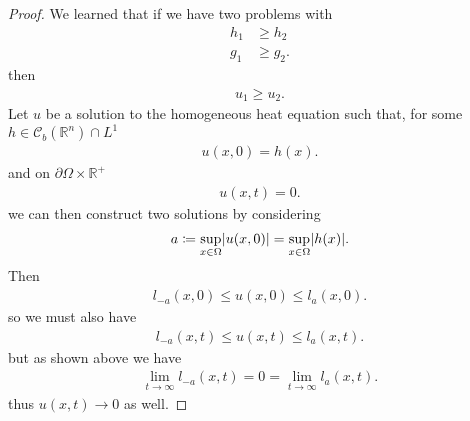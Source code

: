   \begin{proof}
   We learned that if we have two problems with 
   \begin{align*}
     h_{1} &\ge h_{2}\\
     g_{1} &\ge g_{2}
   .\end{align*}
   then 
   \begin{align*}
    u_{1} \ge u_{2}
   .\end{align*}
  Let $u$ be a solution to the homogeneous heat equation such that, for some $h \in  \mathcal{C}_b(\mathbb{R}^{n} ) \cap L^{1} $
  \begin{align*}
    u(x,0) = h(x)
  .\end{align*}
  and  on $\partial \Omega  \times  \mathbb{R}^{+} $
  \begin{align*}
    u(x,t) = 0
  .\end{align*}
  we can then construct two solutions by considering
  \begin{align*}
   a\coloneqq  \sup_{x \in  \Omega } \lvert u(x,0)\rvert =  \sup_{x \in  \Omega } \lvert h(x)\rvert
  .\end{align*}
  Then 
  \begin{align*}
    l_{-a}(x,0) \le u(x,0) \le l_{a}(x,0)
  .\end{align*}
  so we must also have
  \begin{align*}
    l_{-a}(x,t) \le u(x,t) \le l_{a}(x,t)
  .\end{align*}
  but as shown above we have 
  \begin{align*}
    \lim_{t \to \infty} l_{-a}(x,t) = 0 = \lim_{t \to \infty} l_a(x,t)
  .\end{align*}
  thus $u(x,t) \to 0$ as well.
  \end{proof}

